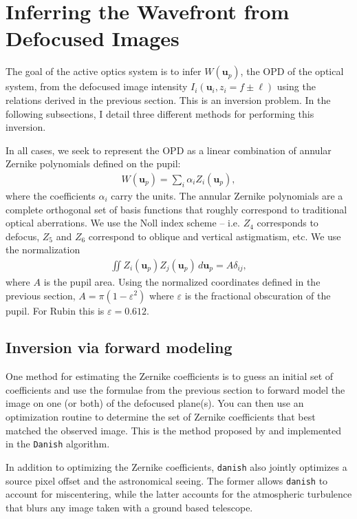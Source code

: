 \documentclass[TS,authoryear,toc]{lsstdoc}
\begin{document}
\section{Inferring the Wavefront from Defocused Images}
\label{sec:estimation}

The goal of the active optics system is to infer $W(\mathbf{u}_p)$, the OPD of the optical system, from the defocused image intensity $I_i(\mathbf{u}_i, z_i = f \pm \ell)$ using the relations derived in the previous section.
This is an inversion problem.
In the following subsections, I detail three different methods for performing this inversion.

In all cases, we seek to represent the OPD as a linear combination of annular Zernike polynomials defined on the pupil:
\begin{align}
    W(\mathbf{u}_p) = \sum_i \alpha_i Z_i(\mathbf{u}_p), 
\end{align}
where the coefficients $\alpha_i$ carry the units.
The annular Zernike polynomials are a complete orthogonal set of basis functions that roughly correspond to traditional optical aberrations.
We use the Noll index scheme -- i.e. $Z_4$ corresponds to defocus, $Z_5$ and $Z_6$ correspond to oblique and vertical astigmatism, etc.
We use the normalization
\begin{align}
    \iint Z_i(\mathbf{u}_p) Z_j(\mathbf{u}_p) \, d \mathbf{u}_p = A \delta_{ij},
    \label{eq:norm}
\end{align}
where $A$ is the pupil area.
Using the normalized coordinates defined in the previous section, $A = \pi (1 - \varepsilon^2)$ where $\varepsilon$ is the fractional obscuration of the pupil.
For Rubin this is $\varepsilon = 0.612$.

\subsection{Inversion via forward modeling}

One method for estimating the Zernike coefficients is to guess an initial set of coefficients and use the formulae from the previous section to forward model the image on one (or both) of the defocused plane(s).
You can then use an optimization routine to determine the set of Zernike coefficients that best matched the observed image.
This is the method proposed by \citet{janish2012} and implemented in the \texttt{Danish} algorithm.

In addition to optimizing the Zernike coefficients, \texttt{danish} also jointly optimizes a source pixel offset and the astronomical seeing.
The former allows \texttt{danish} to account for miscentering, while the latter accounts for the atmospheric turbulence that blurs any image taken with a ground based telescope.
\end{document}
